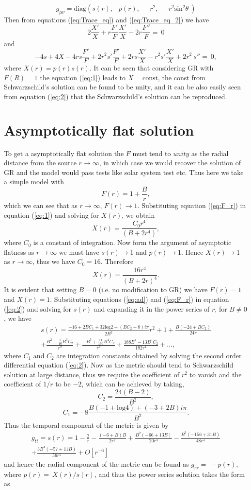 \documentclass[12pt,a4paper,oneside]{book}
\newcommand{\eq}[2]{\begin{equation} \label{eq:#1} #2 \end{equation}}
\newcommand{\meq}[2]{\begin{multline}\label{eq:#1} #2 \end{multline}}
\newcommand{\Eref}[1]{(\ref{eq:#1})}
\begin{document}
\[g_{\mu\nu} =\mathrm{diag}\left(s\left(r\right),-p\left(r\right),\ -r^2,\ -r^2{{\mathrm{sin}}^2 \theta \ }\right)\]
Then from equations \Eref{Trace_eq} and \Eref{Trace_eq_2} we have \cite{Mut_Vij_06} 
\eq{1}{2\frac{X'}{X}+r\frac{F'}{F}\frac{X'}{X}-2r\frac{F''}{F}=\ 0}
\noindent and
\eq{2}{-4s+4X-4rs\frac{F'}{F}+2r^2s' \frac{F'}{F} +2rs\frac{X'}{X}-r^2 s' \frac{X'}{X}+2r^2\ s''=\ 0,} 
\noindent where $X\left(r\right)=p\left(r\right)s\left(r\right)$.
It can be seen that considering GR with $F(R) = 1$ the equation \Eref{1} leads to $X = \text{const}$, the const from Schwarzschild's solution can be found to be unity, and it can be also easily seen from equation \Eref{2} that the Schwarzschild's solution can be reproduced. \label{Sec_Basic_Form}

\section{Asymptotically flat solution}\label{Sec_non_rot_sol}

To get a asymptotically flat solution the $F$ must tend to $unity$ as the radial distance from the source $r\to \infty$, in which case we would recover the solution of GR and the model would pass tests like solar system test etc. Thus here we take a simple model with \cite{Kalita_Bani}
\eq{F_r}{F(r) = 1+\frac{B}{r},}
which we can see that as $r\to \infty$, $F(r)\to1$. Substituting equation \Eref{F_r} in equation \Eref{1} and solving for $X(r)$, we obtain
\eq{X_r}{X(r) = \frac{C_0r^4}{(B+2r^4)},}
where $C_0$ is a constant of integration. Now form the argument of asymptotic flatness as $r\to\infty$ we must have $s(r)\to1$ and $p(r)\to1$. Hence $X(r)\to1$ as $r\to\infty$, thus we have $C_0 = 16$. Therefore
\eq{ad}{X\left(r\right)=\frac{16r^4}{{\left(B+2r\right)}^4}.}
It is evident that setting $B=0$ (i.e. no modification to GR) we have $F(r) = 1$ and $X(r)=1$. Substituting equations \Eref{ad} and \Eref{F_r} in equation \Eref{2} and solving for $s(r)$ and expanding it in the power series of $r$, for $B\neq0$, we have
\meq{3}{
s\left(r\right)={} \frac{-16+2BC_1+32{\mathrm{log} 2 }+\left(BC_2+8\right)i\pi}{2B^2}r^2+1+\frac{B\left(-24+BC_2\right)}{24r}
	\\+\frac{B^2-\frac{1}{16}B^3C_2}{r^2}+\frac{-B^3+\frac{11}{160}B^4C_2}{r^3}+\frac{188B^4-13B^5C_2}{192r^4}+ \dots,}
where $C_1$ and $C_2$ are integration constants obtained by solving the second order differential equation \Eref{2}. Now as the metric should tend to Schwarzschild solution at large distance, thus we require the coefficient of $r^2$ to vanish and the coefficient of $1/r$ to be $-2$, which can be achieved by taking,
\eq{}{C_2=\frac{24\left(B-2\right)}{B^2},} 
\eq{}{C_1= -8\frac{B\left(-1+{\mathrm{log} 4 }\right)+\left(-3+2B\right)i\pi }{B^2}.}
Thus the temporal component of the metric is given by
\meq{4}{
g_{tt}=s\left(r\right)= 1-\frac{2}{r}-\frac{\left(-6+B\right)B}{2r^2}+\frac{B^2\left(-66+13B\right)}{20r^3}
-\frac{B^3\left(-156+31B\right)}{48r^4}\\+\frac{3B^4\left(-57+11B\right)}{56r^5}+O\left[r^{-6}\right]
}
and hence the radial component of the metric can be found as $g_{rr}=\ -p\left(r\right)$, where $p\left(r\right)=\ X(r)/s(r)$, and thus the power series solution takes the form as
\end{document}
